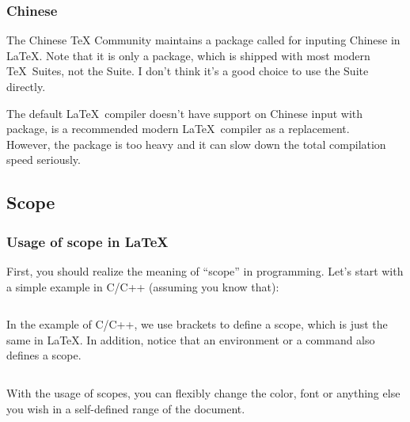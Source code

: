 \begin{frame}[fragile]
	\frametitle{Chinese}
	The Chinese TeX Community maintains a package called  for inputing Chinese in \LaTeX. Note that it is only a package, which is shipped with most modern \TeX\ Suites, not the  Suite. I don't think it's a good choice to use the  Suite directly.
	\begin{command}
		\LC{\usepackage{ctex}}
	\end{command}
	The default \LaTeX\ compiler  doesn't have support on Chinese input with  package,  is a recommended modern \LaTeX\ compiler as a replacement. \\

	However, the  package is too heavy and it can slow down the total compilation speed seriously. 
\end{frame}

\subsection{Scope}

\begin{frame}[fragile]
	\frametitle{Usage of scope in \LaTeX}
	First, you should realize the meaning of ``scope'' in programming. Let's start with a simple example in C/C++ (assuming you know that):
	\inputminted{c++}{examples/scope.cpp}
\end{frame}

\begin{frame}[fragile]
	In the example of C/C++, we use brackets \structure{\{\}} to define a scope, which is just the same in \LaTeX. In addition, notice that an environment or a command also defines a scope.

	\begin{example}
	\begin{multicols}{2}
		\inputminted{latex}{examples/scope.tex}
		\columnbreak
		
	\end{multicols}
	\end{example}

	With the usage of scopes, you can flexibly change the color, font or anything else you wish in a self-defined range of the document.

\end{frame}
